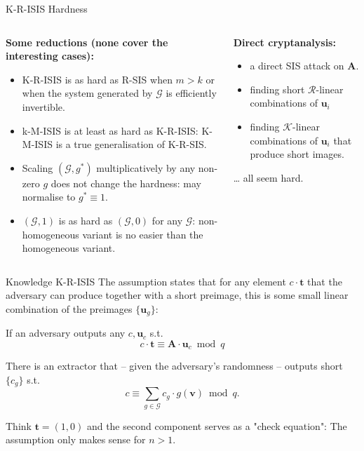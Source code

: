 \documentclass[xcolor=table,10pt,aspectratio=169]{beamer}
\renewcommand{\vec}[1]{\ensuremath{\mathbf{#1}}\xspace}
\providecommand{\mat}[1]{\ensuremath{\vec{#1}}\xspace}
\providecommand{\ring}[0]{\ensuremath{\mathcal{R}}\xspace}
\begin{document}
\begin{frame}[label={sec:org1002678}]{K-R-ISIS Hardness}
\begin{columns}
\begin{column}[t]{0.65\columnwidth}
\textbf{Some reductions (none cover the interesting cases):}
\begin{itemize}
\item K-R-ISIS is as hard as R-SIS when \(m > k\) or when the system generated by \(\mathcal{G}\) is efficiently invertible.
\item k-M-ISIS is at least as hard as K-R-ISIS: K-M-ISIS is a true generalisation of K-R-SIS.
\item Scaling \((\mathcal{G},g^*)\) multiplicatively by any non-zero \(g\) does not change the hardness: may normalise to \(g^{*} \equiv 1\).
\item \((\mathcal{G},1)\) is as hard as \((\mathcal{G},0)\) for any \(\mathcal{G}\): non-homogeneous variant is no easier than the homogeneous variant.
\end{itemize}
\end{column}

\begin{column}[t]{0.35\columnwidth}
\textbf{Direct cryptanalysis:}
\begin{itemize}
\item a direct SIS attack on \(\mat{A}\).
\item finding short \(\ring\)-linear combinations of \(\vec{u}_{i}\)
\item finding \(\mathcal{K}\)-linear combinations of \(\vec{u}_{i}\) that produce short images.
\end{itemize}

… all seem hard.
\end{column}
\end{columns}
\end{frame}

\begin{frame}[label={sec:org3eb0ce2}]{Knowledge K-R-ISIS}
The assumption states that for any element \(c \cdot \vec{t}\) that the adversary can produce together with a short preimage, this is some small linear combination of the preimages \(\{\vec{u}_{g}\}\):

\begin{definition}
If an adversary outputs any \(c, \vec{u}_{c}\) s.t.
\[
c \cdot \vec{t} \equiv \mat{A} \cdot \vec{u}_{c} \bmod q
\]

There is an extractor that -- given the adversary's randomness -- outputs short
\(\{c_{g}\}\) s.t.
\[
c \equiv \sum_{g \in \mathcal{G}} c_{g} \cdot g(\vec{v}) \bmod q.
\]
\end{definition}

Think \(\vec{t} = (1,0)\) and the second component serves as a "check equation": The assumption only makes sense for \(n>1\).
\end{frame}
\end{document}
